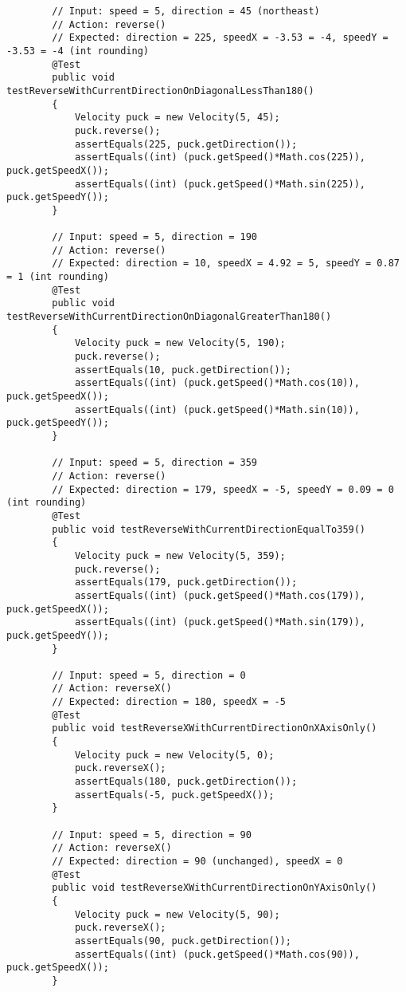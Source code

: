 \documentclass{article}
\begin{document}
\begin{lstlisting}
        // Input: speed = 5, direction = 45 (northeast)
        // Action: reverse()
        // Expected: direction = 225, speedX = -3.53 = -4, speedY = -3.53 = -4 (int rounding)
        @Test
        public void testReverseWithCurrentDirectionOnDiagonalLessThan180()
        {
            Velocity puck = new Velocity(5, 45);
            puck.reverse();
            assertEquals(225, puck.getDirection());
            assertEquals((int) (puck.getSpeed()*Math.cos(225)), puck.getSpeedX());
            assertEquals((int) (puck.getSpeed()*Math.sin(225)), puck.getSpeedY());
        }

        // Input: speed = 5, direction = 190
        // Action: reverse()
        // Expected: direction = 10, speedX = 4.92 = 5, speedY = 0.87 = 1 (int rounding)
        @Test
        public void testReverseWithCurrentDirectionOnDiagonalGreaterThan180()
        {
            Velocity puck = new Velocity(5, 190);
            puck.reverse();
            assertEquals(10, puck.getDirection());
            assertEquals((int) (puck.getSpeed()*Math.cos(10)), puck.getSpeedX());
            assertEquals((int) (puck.getSpeed()*Math.sin(10)), puck.getSpeedY());
        }

        // Input: speed = 5, direction = 359
        // Action: reverse()
        // Expected: direction = 179, speedX = -5, speedY = 0.09 = 0 (int rounding)
        @Test
        public void testReverseWithCurrentDirectionEqualTo359()
        {
            Velocity puck = new Velocity(5, 359);
            puck.reverse();
            assertEquals(179, puck.getDirection());
            assertEquals((int) (puck.getSpeed()*Math.cos(179)), puck.getSpeedX());
            assertEquals((int) (puck.getSpeed()*Math.sin(179)), puck.getSpeedY());
        }

        // Input: speed = 5, direction = 0
        // Action: reverseX()
        // Expected: direction = 180, speedX = -5
        @Test
        public void testReverseXWithCurrentDirectionOnXAxisOnly()
        {
            Velocity puck = new Velocity(5, 0);
            puck.reverseX();
            assertEquals(180, puck.getDirection());
            assertEquals(-5, puck.getSpeedX());
        }

        // Input: speed = 5, direction = 90
        // Action: reverseX()
        // Expected: direction = 90 (unchanged), speedX = 0
        @Test
        public void testReverseXWithCurrentDirectionOnYAxisOnly()
        {
            Velocity puck = new Velocity(5, 90);
            puck.reverseX();
            assertEquals(90, puck.getDirection());
            assertEquals((int) (puck.getSpeed()*Math.cos(90)), puck.getSpeedX());
        }


\end{lstlisting}
\end{document}
